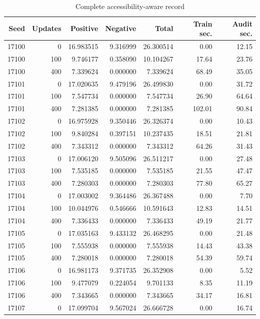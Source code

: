\begin{table}[p]\centering\footnotesize
\caption{Complete accessibility-aware record}\label{supp:table-accessible}
\begin{tabular}{rrrrrrr}\toprule
Seed & Updates & Positive & Negative & Total & Train sec. & Audit sec.\\
\midrule
17100 & 0 & 16.983515 & 9.316999 & 26.300514 & 0.00 & 12.15 \\
17100 & 100 & 9.746177 & 0.358090 & 10.104267 & 17.64 & 23.76 \\
17100 & 400 & 7.339624 & 0.000000 & 7.339624 & 68.49 & 35.05 \\
17101 & 0 & 17.020635 & 9.479196 & 26.499830 & 0.00 & 31.72 \\
17101 & 100 & 7.547734 & 0.000000 & 7.547734 & 26.90 & 64.64 \\
17101 & 400 & 7.281385 & 0.000000 & 7.281385 & 102.01 & 90.84 \\
17102 & 0 & 16.975928 & 9.350446 & 26.326374 & 0.00 & 10.43 \\
17102 & 100 & 9.840284 & 0.397151 & 10.237435 & 18.51 & 21.81 \\
17102 & 400 & 7.343312 & 0.000000 & 7.343312 & 64.26 & 31.43 \\
17103 & 0 & 17.006120 & 9.505096 & 26.511217 & 0.00 & 27.48 \\
17103 & 100 & 7.535185 & 0.000000 & 7.535185 & 21.55 & 47.47 \\
17103 & 400 & 7.280303 & 0.000000 & 7.280303 & 77.80 & 65.27 \\
17104 & 0 & 17.003002 & 9.364486 & 26.367488 & 0.00 & 7.70 \\
17104 & 100 & 10.044976 & 0.546666 & 10.591643 & 12.83 & 14.51 \\
17104 & 400 & 7.336433 & 0.000000 & 7.336433 & 49.19 & 21.77 \\
17105 & 0 & 17.035163 & 9.433132 & 26.468295 & 0.00 & 21.48 \\
17105 & 100 & 7.555938 & 0.000000 & 7.555938 & 14.43 & 43.38 \\
17105 & 400 & 7.280018 & 0.000000 & 7.280018 & 54.39 & 59.74 \\
17106 & 0 & 16.981173 & 9.371735 & 26.352908 & 0.00 & 5.52 \\
17106 & 100 & 9.477079 & 0.224054 & 9.701133 & 8.35 & 11.19 \\
17106 & 400 & 7.343665 & 0.000000 & 7.343665 & 34.17 & 16.81 \\
17107 & 0 & 17.099704 & 9.567024 & 26.666728 & 0.00 & 16.74 \\

\end{tabular}
\end{table}
